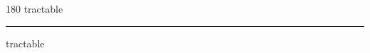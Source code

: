 
\begin{frame}
\begin{center}
\begin{turn}{180}
{\fontsize{2.5cm}{1em}\selectfont tractable}
\end{turn}
\vspace{1em}\par  
\hrule
\vspace{1em}\par  
{\fontsize{2.5cm}{1em}\selectfont tractable}
\end{center}
\end{frame}
